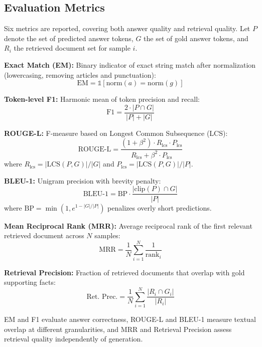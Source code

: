 \documentclass[conference]{IEEEtran}
\begin{document}
\subsection{Evaluation Metrics}
Six metrics are reported, covering both answer quality and retrieval quality. Let $P$ denote the set of predicted answer tokens, $G$ the set of gold answer tokens, and $R_i$ the retrieved document set for sample $i$.

\textbf{Exact Match (EM):} Binary indicator of exact string match after normalization (lowercasing, removing articles and punctuation):
\begin{equation}
\text{EM} = \mathbb{1}[\text{norm}(a) = \text{norm}(g)]
\end{equation}

\textbf{Token-level F1:} Harmonic mean of token precision and recall:
\begin{equation}
\text{F1} = \frac{2 \cdot |P \cap G|}{|P| + |G|}
\end{equation}

\textbf{ROUGE-L:} F-measure based on Longest Common Subsequence (LCS):
\begin{equation}
\text{ROUGE-L} = \frac{(1 + \beta^2) \cdot R_{\text{lcs}} \cdot P_{\text{lcs}}}{R_{\text{lcs}} + \beta^2 \cdot P_{\text{lcs}}}
\end{equation}
where $R_{\text{lcs}} = |\text{LCS}(P,G)|/|G|$ and $P_{\text{lcs}} = |\text{LCS}(P,G)|/|P|$.

\textbf{BLEU-1:} Unigram precision with brevity penalty:
\begin{equation}
\text{BLEU-1} = \text{BP} \cdot \frac{|\text{clip}(P) \cap G|}{|P|}
\end{equation}
where $\text{BP} = \min(1, e^{1-|G|/|P|})$ penalizes overly short predictions.

\textbf{Mean Reciprocal Rank (MRR):} Average reciprocal rank of the first relevant retrieved document across $N$ samples:
\begin{equation}
\text{MRR} = \frac{1}{N} \sum_{i=1}^{N} \frac{1}{\text{rank}_i}
\end{equation}

\textbf{Retrieval Precision:} Fraction of retrieved documents that overlap with gold supporting facts:
\begin{equation}
\text{Ret. Prec.} = \frac{1}{N} \sum_{i=1}^{N} \frac{|R_i \cap G_i|}{|R_i|}
\end{equation}

EM and F1 evaluate answer correctness, ROUGE-L and BLEU-1 measure textual overlap at different granularities, and MRR and Retrieval Precision assess retrieval quality independently of generation.
\end{document}
